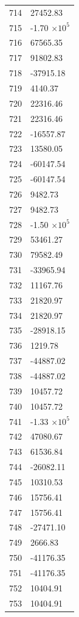 \documentclass[a4paper,11pt]{article}
\begin{document}
\begin{center}
\begin{longtable}{|R{1.5cm}|R{2.5cm}|}
  714 &     27452.83 \\
  715 &        -1.70 $\times 10^{           5}$ \\
  716 &     67565.35 \\
  717 &     91802.83 \\
  718 &    -37915.18 \\
  719 &      4140.37 \\
  720 &     22316.46 \\
  721 &     22316.46 \\
  722 &    -16557.87 \\
  723 &     13580.05 \\
  724 &    -60147.54 \\
  725 &    -60147.54 \\
  726 &      9482.73 \\
  727 &      9482.73 \\
  728 &        -1.50 $\times 10^{           5}$ \\
  729 &     53461.27 \\
  730 &     79582.49 \\
  731 &    -33965.94 \\
  732 &     11167.76 \\
  733 &     21820.97 \\
  734 &     21820.97 \\
  735 &    -28918.15 \\
  736 &      1219.78 \\
  737 &    -44887.02 \\
  738 &    -44887.02 \\
  739 &     10457.72 \\
  740 &     10457.72 \\
  741 &        -1.33 $\times 10^{           5}$ \\
  742 &     47080.67 \\
  743 &     61536.84 \\
  744 &    -26082.11 \\
  745 &     10310.53 \\
  746 &     15756.41 \\
  747 &     15756.41 \\
  748 &    -27471.10 \\
  749 &      2666.83 \\
  750 &    -41176.35 \\
  751 &    -41176.35 \\
  752 &     10404.91 \\
  753 &     10404.91 \\

\end{longtable}
\end{center}
\end{document}
